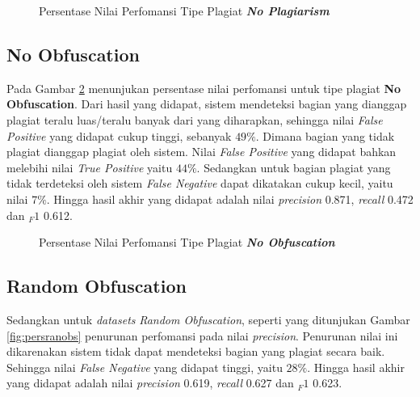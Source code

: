 \documentclass[../Book.tex]{subfiles}
\begin{document}
\begin{figure}[H]
	\centering
	\caption{Persentase Nilai Perfomansi Tipe Plagiat \textbf{\textit{No Plagiarism}}}
	\label{fig:persnoplag}
\end{figure}

\subsection{No Obfuscation}

\noindent Pada Gambar \ref{fig:persnoobs} menunjukan persentase nilai perfomansi untuk tipe plagiat \textbf{No Obfuscation}. Dari hasil yang didapat, sistem mendeteksi bagian yang dianggap plagiat teralu luas/teralu banyak dari yang diharapkan, sehingga nilai \textit{False Positive} yang didapat cukup tinggi, sebanyak $49\%$. Dimana bagian yang tidak plagiat dianggap plagiat oleh sistem. Nilai \textit{False Positive} yang didapat bahkan melebihi nilai \textit{True Positive} yaitu $44\%$. Sedangkan untuk bagian plagiat yang tidak terdeteksi oleh sistem \textit{False Negative} dapat dikatakan cukup kecil, yaitu nilai $7\%$. Hingga hasil akhir yang didapat adalah nilai \textit{precision} 0.871, \textit{recall} 0.472 dan $_F{1}$ 0.612.

\begin{figure}[H]
	\centering
	\caption{Persentase Nilai Perfomansi Tipe Plagiat \textbf{\textit{No Obfuscation}}}
	\label{fig:persnoobs}
\end{figure}

\subsection{Random Obfuscation}

\noindent Sedangkan untuk \textit{datasets} \textit{Random Obfuscation}, seperti yang ditunjukan Gambar \ref{fig:persranobs} penurunan perfomansi pada nilai \textit{precision}. Penurunan nilai ini dikarenakan sistem tidak dapat mendeteksi bagian yang plagiat secara baik. Sehingga nilai \textit{False Negative} yang didapat tinggi, yaitu $28\%$. Hingga hasil akhir yang didapat adalah nilai \textit{precision} 0.619, \textit{recall} 0.627 dan $_F{1}$ 0.623.
\end{document}
